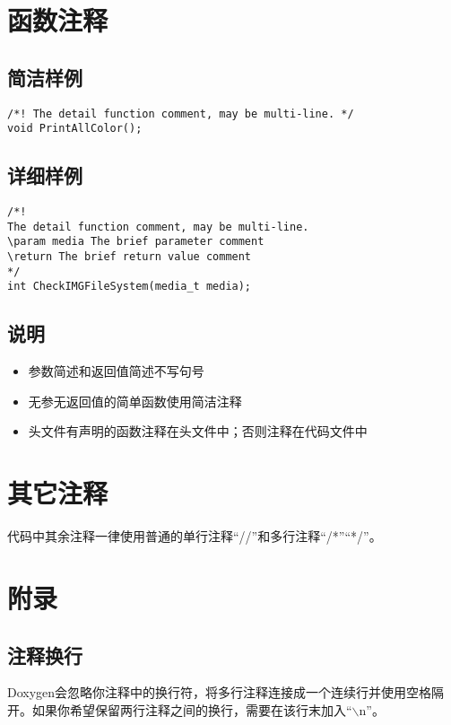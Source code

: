 \documentclass[11pt,a4paper]{article}
\begin{document}
\section{函数注释}
\subsection{简洁样例}
\begin{lstlisting}[language={[ANSI]C}]
/*! The detail function comment, may be multi-line. */
void PrintAllColor();
\end{lstlisting}
\subsection{详细样例}
\begin{lstlisting}[language={[ANSI]C}, morekeywords={media_t}]
/*!
The detail function comment, may be multi-line.
\param media The brief parameter comment
\return The brief return value comment
*/
int CheckIMGFileSystem(media_t media);
\end{lstlisting}
\subsection{说明}
\begin{itemize}
\item 参数简述和返回值简述不写句号
\item 无参无返回值的简单函数使用简洁注释
\item 头文件有声明的函数注释在头文件中；否则注释在代码文件中
\end{itemize}
\section{其它注释}
代码中其余注释一律使用普通的单行注释“{//}”和多行注释“{/*}”“{*/}”。
\section{附录}
\subsection{注释换行}
Doxygen会忽略你注释中的换行符，将多行注释连接成一个连续行并使用空格隔开。如果你希望保留两行注释之间的换行，需要在该行末加入“{$\backslash$n}”。
\end{document}
